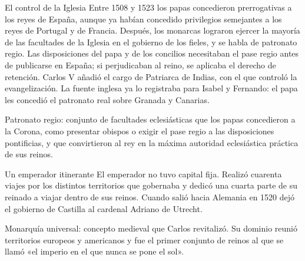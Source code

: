 \documentclass{book}
\begin{document}
\begin{tcolorbox}[title={Definición}, studiumdef, breakable]

El control de la Iglesia
Entre 1508 y 1523 los papas concedieron prerrogativas a los reyes de España, aunque ya habían concedido privilegios semejantes a los reyes de Portugal y de Francia. Después, los monarcas lograron ejercer la mayoría de las facultades de la Iglesia en el gobierno de los fieles, y se habla de patronato regio. Las disposiciones del papa y de los concilios necesitaban el pase regio antes de publicarse en España; si perjudicaban al reino, se aplicaba el derecho de retención. Carlos V añadió el cargo de Patriarca de Indias, con el que controló la evangelización. La fuente inglesa ya lo registraba para Isabel y Fernando: el papa les concedió el patronato real sobre Granada y Canarias.

\end{tcolorbox}

\begin{tcolorbox}[title={Definición}, studiumdef, breakable]

Patronato regio: conjunto de facultades eclesiásticas que los papas concedieron a la Corona, como presentar obispos o exigir el pase regio a las disposiciones pontificias, y que convirtieron al rey en la máxima autoridad eclesiástica práctica de sus reinos.

\end{tcolorbox}

\begin{tcolorbox}[title={Definición}, studiumdef, breakable]

Un emperador itinerante
El emperador no tuvo capital fija. Realizó cuarenta viajes por los distintos territorios que gobernaba y dedicó una cuarta parte de su reinado a viajar dentro de sus reinos. Cuando salió hacia Alemania en 1520 dejó el gobierno de Castilla al cardenal Adriano de Utrecht.

\end{tcolorbox}

\begin{tcolorbox}[title={Definición}, studiumdef, breakable]

Monarquía universal: concepto medieval que Carlos revitalizó. Su dominio reunió territorios europeos y americanos y fue el primer conjunto de reinos al que se llamó «el imperio en el que nunca se pone el sol».

\end{tcolorbox}
\end{document}
